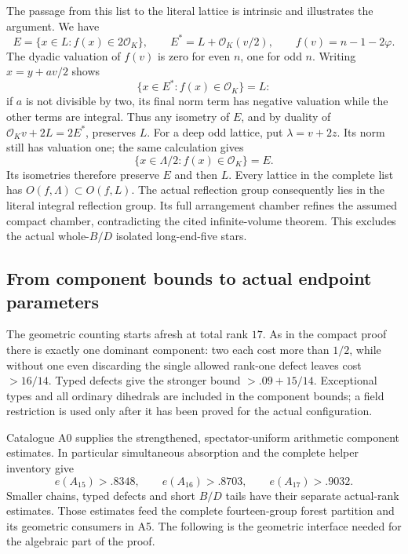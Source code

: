 \documentclass[11pt]{article}
\theoremstyle{remark}\newtheorem{remark}[theorem]{Remark}
\numberwithin{equation}{section}
\begin{document}
The passage from this list to the literal lattice is intrinsic and
illustrates the argument. We have
\[
 E=\{x\in L:f(x)\in2\mathcal O_K\},\qquad
 E^*=L+\mathcal O_K(v/2),\qquad f(v)=n-1-2\varphi.
\]
The dyadic valuation of $f(v)$ is zero for even $n$, one for odd $n$.
Writing $x=y+av/2$ shows
\[
 \{x\in E^*:f(x)\in\mathcal O_K\}=L:
\]
if $a$ is not divisible by two, its final norm term has negative
valuation while the other terms are integral. Thus any isometry of
$E$, and by duality of $\mathcal O_Kv+2L=2E^*$, preserves $L$.
For a deep odd lattice, put $\lambda=v+2z$. Its norm still has
valuation one; the same calculation gives
\[
 \{x\in\Lambda/2:f(x)\in\mathcal O_K\}=E.
\]
Its isometries therefore preserve $E$ and then $L$. Every lattice in the
complete list has $O(f,\Lambda)\subset O(f,L)$.
The actual reflection group consequently lies in the literal integral
reflection group. Its full arrangement chamber refines the assumed
compact chamber, contradicting the cited infinite-volume theorem.
This excludes the actual whole-$B/D$ isolated long-end-five stars.


\subsection{From component bounds to actual endpoint parameters}
\label{arith:sec:seventeen}
The geometric counting starts afresh at total rank $17$. As in the
compact proof there is exactly one dominant component: two each cost
more than $1/2$, while without one even discarding the single allowed
rank-one defect leaves cost $>16/14$. Typed defects give the stronger
bound $>.09+15/14$. Exceptional types and all ordinary dihedrals are
included in the component bounds; a field restriction is used only
after it has been proved for the actual configuration.

Catalogue A0 supplies the strengthened, spectator-uniform arithmetic
component estimates. In particular simultaneous absorption and the
complete helper inventory give
\[
 e(A_{15})>.8348,\qquad e(A_{16})>.8703,
 \qquad e(A_{17})>.9032.
\]
Smaller chains, typed defects and short $B/D$ tails have their separate
actual-rank estimates. Those estimates feed the complete fourteen-group
forest partition and its geometric consumers in A5. The following is the
geometric interface needed for the algebraic part of the proof.
\end{document}
